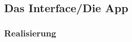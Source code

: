 \subsection{Das Interface/Die App}
\label{ssec:interface}
	
	\subsubsection{Realisierung}
	\label{sssec:realisierung}
